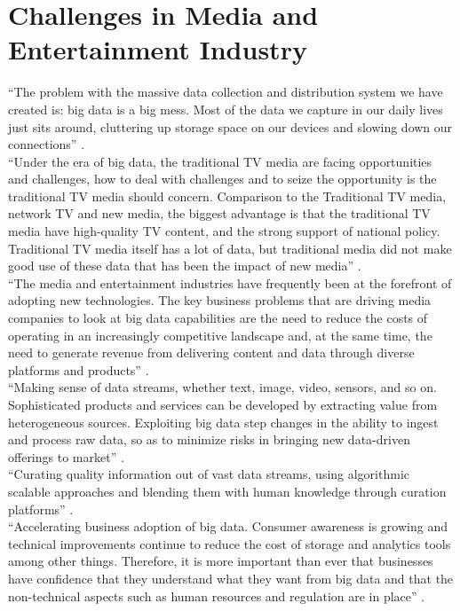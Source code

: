 \documentclass[sigconf]{acmart}
\begin{document}
\section{Challenges in Media and Entertainment Industry}

``The problem with the massive data collection and distribution system we have created is: big data is a big mess. Most of the data we capture in our daily lives just sits around, cluttering up storage space on our devices and slowing down our connections'' \cite{Schlieski2012data}. \\
``Under the era of big data, the traditional TV media are facing opportunities and challenges, how to deal with challenges and to seize the opportunity is the traditional TV media should concern. Comparison to the Traditional TV media, network TV and new media, the biggest advantage is that the traditional TV media have high-quality TV content, and the strong support of national policy. Traditional TV media itself has a lot of data, but traditional media did not make good use of these data that has been the impact of new media'' \cite{Zhang2017era}. \\
``The media and entertainment industries have frequently been at the forefront of adopting new technologies. The key business problems that are driving media companies to look at big data capabilities are the need to reduce the costs of operating in an increasingly competitive landscape and, at the same time, the need to generate revenue from delivering content and data through diverse platforms and products'' \cite{Lippell2016sectors}. \\
``Making sense of data streams, whether text, image, video, sensors, and so on. Sophisticated products and services can be developed by extracting value from heterogeneous sources.
Exploiting big data step changes in the ability to ingest and process raw data, so as to minimize risks in bringing new data-driven offerings to market'' \cite{Lippell2016sectors}. \\
``Curating quality information out of vast data streams, using algorithmic scalable approaches and blending them with human knowledge through curation platforms'' \cite{Lippell2016sectors}. \\
``Accelerating business adoption of big data. Consumer awareness is growing and technical improvements continue to reduce the cost of storage and analytics tools among other things. Therefore, it is more important than ever that businesses have confidence that they understand what they want from big data and that the non-technical aspects such as human resources and regulation are in place'' \cite{Lippell2016sectors}.
\end{document}

